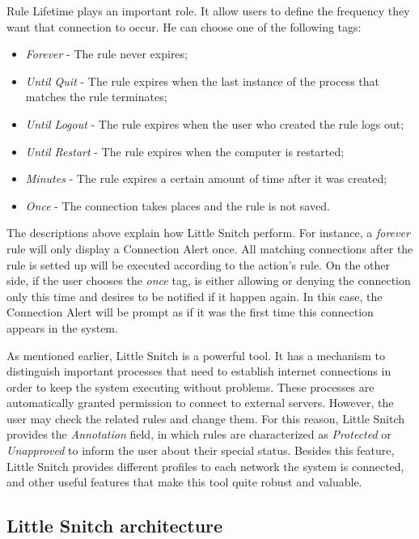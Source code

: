 Rule Lifetime plays an important role. It allow users to define the frequency they want that connection to occur. He can choose one of the following tags:

\begin{itemize}
\item \textit{Forever} - The rule never expires;
\item \textit{Until Quit} - The rule expires when the last instance of the process that matches the rule terminates;
\item \textit{Until Logout} - The rule expires when the user who created the rule logs out;
\item \textit{Until Restart} - The rule expires when the computer is restarted;
\item \textit{Minutes} - The rule expires a certain amount of time after it was created;
\item \textit{Once} - The connection takes places and the rule is not saved.
\end{itemize}

The descriptions above explain how Little Snitch perform. For instance, a \textit{forever} rule will only display a Connection Alert once. All matching connections after the rule is setted up will be executed according to the action's rule. On the other side, if the user chooses the \textit{once} tag, is either allowing or denying the connection only this time and desires to be notified if it happen again. In this case, the Connection Alert will be prompt as if it was the first time this connection appears in the system.

As mentioned earlier, Little Snitch is a powerful tool. It has a mechanism to distinguish important processes that need to establish internet connections in order to keep the system executing without problems. These processes are automatically granted permission to connect to external servers. However, the user may check the related rules and change them. For this reason, Little Snitch provides the \textit{Annotation} field, in which rules are characterized as \textit{Protected} or \textit{Unapproved} to inform the user about their special status. Besides this feature, Little Snitch provides different profiles to each network the system is connected, and other useful features that make this tool quite robust and valuable.

\subsection{Little Snitch architecture}

